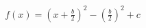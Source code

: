 \documentclass[preview]{standalone}
\begin{document}
\begin{align*}
f(x) = \left(x + \frac{b}{2}\right)^2 - \left(\frac{b}{2}\right)^2 + c
\end{align*}
\end{document}
